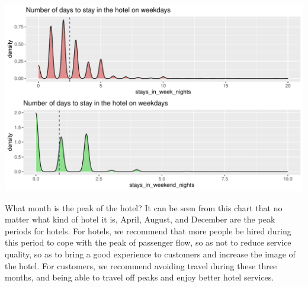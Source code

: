 \documentclass[11pt,a4paper,]{article}
\begin{document}
\includegraphics{tidy_files/figure-latex/unnamed-chunk-10-1.pdf}

What month is the peak of the hotel?
It can be seen from this chart that no matter what kind of hotel it is, April, August, and December are the peak periods for hotels.
For hotels, we recommend that more people be hired during this period to cope with the peak of passenger flow, so as not to reduce service quality, so as to bring a good experience to customers and increase the image of the hotel.
For customers, we recommend avoiding travel during these three months, and being able to travel off peaks and enjoy better hotel services.
\end{document}
